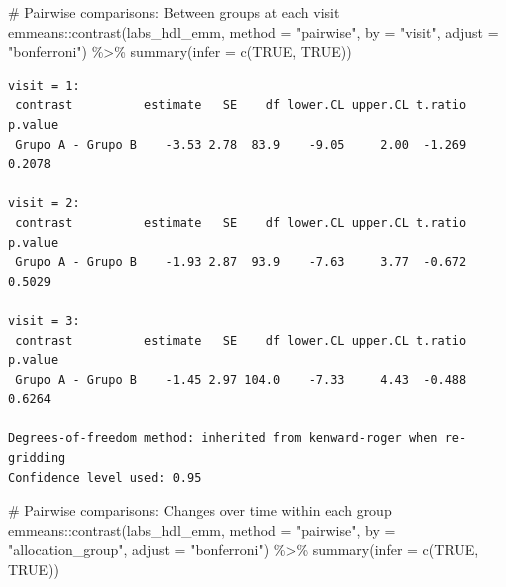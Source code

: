 \documentclass[
  letterpaper,
  DIV=11,
  numbers=noendperiod]{scrartcl}
\newenvironment{Shaded}{\begin{snugshade}}{\end{snugshade}}
\newcommand{\AttributeTok}[1]{\textcolor[rgb]{0.40,0.45,0.13}{#1}}
\newcommand{\CommentTok}[1]{\textcolor[rgb]{0.37,0.37,0.37}{#1}}
\newcommand{\ConstantTok}[1]{\textcolor[rgb]{0.56,0.35,0.01}{#1}}
\newcommand{\FunctionTok}[1]{\textcolor[rgb]{0.28,0.35,0.67}{#1}}
\newcommand{\NormalTok}[1]{\textcolor[rgb]{0.00,0.23,0.31}{#1}}
\newcommand{\SpecialCharTok}[1]{\textcolor[rgb]{0.37,0.37,0.37}{#1}}
\newcommand{\StringTok}[1]{\textcolor[rgb]{0.13,0.47,0.30}{#1}}
\begin{document}
\begin{Shaded}
\begin{Highlighting}[]
\CommentTok{\# Pairwise comparisons: Between groups at each visit}
\NormalTok{emmeans}\SpecialCharTok{::}\FunctionTok{contrast}\NormalTok{(labs\_hdl\_emm, }\AttributeTok{method =} \StringTok{"pairwise"}\NormalTok{, }\AttributeTok{by =} \StringTok{"visit"}\NormalTok{, }\AttributeTok{adjust =} \StringTok{"bonferroni"}\NormalTok{) }\SpecialCharTok{\%\textgreater{}\%} \FunctionTok{summary}\NormalTok{(}\AttributeTok{infer =} \FunctionTok{c}\NormalTok{(}\ConstantTok{TRUE}\NormalTok{, }\ConstantTok{TRUE}\NormalTok{))}
\end{Highlighting}
\end{Shaded}

\begin{verbatim}
visit = 1:
 contrast          estimate   SE    df lower.CL upper.CL t.ratio p.value
 Grupo A - Grupo B    -3.53 2.78  83.9    -9.05     2.00  -1.269  0.2078

visit = 2:
 contrast          estimate   SE    df lower.CL upper.CL t.ratio p.value
 Grupo A - Grupo B    -1.93 2.87  93.9    -7.63     3.77  -0.672  0.5029

visit = 3:
 contrast          estimate   SE    df lower.CL upper.CL t.ratio p.value
 Grupo A - Grupo B    -1.45 2.97 104.0    -7.33     4.43  -0.488  0.6264

Degrees-of-freedom method: inherited from kenward-roger when re-gridding 
Confidence level used: 0.95 
\end{verbatim}

\begin{Shaded}
\begin{Highlighting}[]
\CommentTok{\# Pairwise comparisons: Changes over time within each group}
\NormalTok{emmeans}\SpecialCharTok{::}\FunctionTok{contrast}\NormalTok{(labs\_hdl\_emm, }\AttributeTok{method =} \StringTok{"pairwise"}\NormalTok{, }\AttributeTok{by =} \StringTok{"allocation\_group"}\NormalTok{, }\AttributeTok{adjust =} \StringTok{"bonferroni"}\NormalTok{) }\SpecialCharTok{\%\textgreater{}\%} \FunctionTok{summary}\NormalTok{(}\AttributeTok{infer =} \FunctionTok{c}\NormalTok{(}\ConstantTok{TRUE}\NormalTok{, }\ConstantTok{TRUE}\NormalTok{))}
\end{Highlighting}
\end{Shaded}
\end{document}
